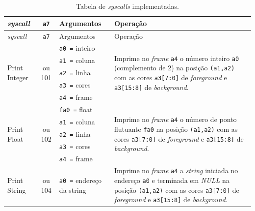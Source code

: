     \begin{longtable}{|l|c|p{3cm}|l |}
        \caption{Tabela de \textit{syscalls} implementadas.}\label{table:syscalls}\\
        \hline
        \textit{syscall}                    & \texttt{a7}             & Argumentos                & Operação\\*
        \hline
        \endfirsthead
        \hline
        \textit{syscall}                    & \texttt{a7}             & Argumentos                & Operação\\*
        \hline
        \endhead
        \multirow{5}{*}{Print Integer}      & \multirow{5}{*}{\parbox{0.6cm}{ ou 101}}
              & \texttt{a0 =} inteiro     & \multirow{5}{*}{\parbox{7cm}{Imprime no \textit{frame} \texttt{a4} o número inteiro \texttt{a0} (complemento de 2) na
                                                posição \texttt{(a1,a2)} com as cores \texttt{a3[7:0]} de \textit{foreground} e \texttt{a3[15:8]} de \textit{background}.}}\\*
            & & \texttt{a1 =} coluna      & \\*
            & & \texttt{a2 =} linha       & \\*
            & & \texttt{a3 =} cores       & \\*
            & & \texttt{a4 =} frame       & \\
        \hline
        \multirow{5}{*}{Print Float}        & \multirow{5}{*}{\parbox{0.6cm}{ ou 102}}
              & \texttt{fa0 =} float      & \multirow{5}{*}{\parbox{7cm}{Imprime no \textit{frame} \texttt{a4} o número de ponto flutuante \texttt{fa0} na
                                                posição \texttt{(a1,a2)} com as cores \texttt{a3[7:0]} de \textit{foreground} e \texttt{a3[15:8]} de \textit{background}.}}\\*
            & & \texttt{a1 =} coluna      & \\*
            & & \texttt{a2 =} linha       & \\*
            & & \texttt{a3 =} cores       & \\*
            & & \texttt{a4 =} frame       & \\
        \hline
        \multirow{5}{*}{Print String}       & \multirow{5}{*}{\parbox{0.6cm}{ ou 104}}
              & \texttt{a0 =} endereço da string  & \multirow{5}{*}{\parbox{7cm}{Imprime no \textit{frame} \texttt{a4} a \textit{string} iniciada no endereço \texttt{a0} e terminada
                                                        em \textit{NULL} na posição \texttt{(a1,a2)} com as cores \texttt{a3[7:0]} de \textit{foreground} e \texttt{a3[15:8]} de \textit{background}.}}\\*

\end{longtable}
